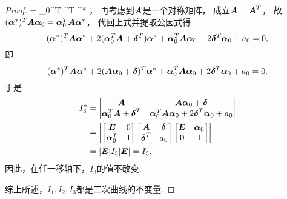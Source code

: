 \begin{theorem}
\begin{proof}
	= \vb\alpha_0^T ^T \vb\alpha^*
\)，
再考虑到\(\boldsymbol{A}\)是一个对称矩阵，
成立\(\boldsymbol{A} = \boldsymbol{A}^T\)，
故\(
	(\boldsymbol\alpha^*)^T \boldsymbol{A} \boldsymbol\alpha_0
	= \boldsymbol\alpha_0^T \boldsymbol{A} \boldsymbol\alpha^*
\)，
代回上式并提取公因式得\begin{equation*}
	(\boldsymbol\alpha^*)^T
	\boldsymbol{A}
	\boldsymbol\alpha^*
	+ 2 (\boldsymbol\alpha_0^T \boldsymbol{A} + \boldsymbol\delta^T) \boldsymbol\alpha^*
	+ \boldsymbol\alpha_0^T
	\boldsymbol{A}
	\boldsymbol\alpha_0
	+ 2 \boldsymbol\delta^T \boldsymbol\alpha_0
	+ a_0
	= 0,
\end{equation*}
即\begin{equation*}
	(\boldsymbol\alpha^*)^T
	\boldsymbol{A}
	\boldsymbol\alpha^*
	+ 2 (\boldsymbol{A} \boldsymbol\alpha_0 + \boldsymbol\delta)^T \boldsymbol\alpha^*
	+ \boldsymbol\alpha_0^T
	\boldsymbol{A}
	\boldsymbol\alpha_0
	+ 2 \boldsymbol\delta^T \boldsymbol\alpha_0
	+ a_0
	= 0.
\end{equation*}
于是\begin{align*}
	I_3^*
	&= \begin{vmatrix}
		\boldsymbol{A} & \boldsymbol{A} \boldsymbol\alpha_0 + \boldsymbol\delta \\
		\boldsymbol\alpha_0^T \boldsymbol{A} + \boldsymbol\delta^T & \boldsymbol\alpha_0^T \boldsymbol{A} \boldsymbol\alpha_0 + 2 \boldsymbol\delta^T \boldsymbol\alpha_0 + a_0
	\end{vmatrix} \\
	&= \abs{
		\begin{bmatrix}
			\boldsymbol{E} & 0 \\
			\boldsymbol\alpha_0^T & 1
		\end{bmatrix}
		\begin{bmatrix}
			\boldsymbol{A} & \boldsymbol\delta \\
			\boldsymbol\delta^T & a_0
		\end{bmatrix}
		\begin{bmatrix}
			\boldsymbol{E} & \boldsymbol\alpha_0 \\
			\boldsymbol0 & 1
		\end{bmatrix}
	} \\
	&= \abs{\boldsymbol{E}} I_3 \abs{\boldsymbol{E}}
	= I_3.
\end{align*}
因此，在任一移轴下，\(I_3\)的值不改变.

综上所述，\(I_1,I_2,I_3\)都是二次曲线的不变量.
\end{proof}
\end{theorem}

